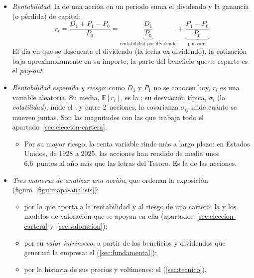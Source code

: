 \documentclass[11pt]{article}
\begin{document}
\begin{itemize}
\begin{itemize}
  \item en el \emph{secundario}, los inversores negocian entre sí y dan liquidez al título. En España, Bolsas y Mercados Españoles (BME), del grupo suizo SIX desde 2020, gestiona las bolsas y BME Growth, el mercado de las empresas más pequeñas; la Comisión Nacional del Mercado de Valores (CNMV) los supervisa con la Ley de los Mercados de Valores y de los Servicios de Inversión\nocite{Ley6_2023}, que traspone la MiFID~II  .
  \end{itemize}
\item \emph{Rentabilidad}: la de una acción en un periodo suma el dividendo y la ganancia (o pérdida) de capital:
  \begin{equation}\label{eq:rentabilidad-accion}
  r_i=\frac{D_1+P_1-P_0}{P_0}=\underbrace{\frac{D_1}{P_0}}_{\text{rentabilidad por dividendo}}+\underbrace{\frac{P_1-P_0}{P_0}}_{\text{plusvalía}}
  \end{equation}
  El día en que se descuenta el dividendo (la fecha ex dividendo), la cotización baja aproximadamente en su importe; la parte del beneficio que se reparte es el \emph{pay-out}.
\item \emph{Rentabilidad esperada y riesgo}: como $D_1$ y $P_1$ no se conocen hoy, $r_i$ es una variable aleatoria. Su media, $\mathbb{E}[r_i]$, es la ; su desviación típica, $\sigma_i$ (la \emph{volatilidad}), mide el ; y entre 2~acciones, la covarianza $\sigma_{ij}$ mide cuánto se mueven juntas. Son las magnitudes con las que trabaja todo el apartado~\ref{sec:eleccion-cartera}.
  \begin{itemize}
  \item Por su mayor riesgo, la renta variable rinde más a largo plazo: en Estados Unidos, de 1928 a 2025, las acciones han rendido de media unos 6,6~puntos al año más que las letras del Tesoro\nocite{Damodaran2026Historical}. Es la  de las acciones.
  \end{itemize}
\item \emph{Tres maneras de analizar una acción}, que ordenan la exposición (figura~\ref{figu:mapa-analisis}):
  \begin{itemize}
  \item por lo que aporta a la rentabilidad y al riesgo de una cartera: la  y los modelos de valoración que se apoyan en ella (apartados~\ref{sec:eleccion-cartera} y~\ref{sec:valoracion});
  \item por su \emph{valor intrínseco}, a partir de los beneficios y dividendos que generará la empresa: el  (\ref{sec:fundamental});
  \item por la historia de sus precios y volúmenes: el  (\ref{sec:tecnico}).
  \end{itemize}
\end{itemize}
\end{document}
